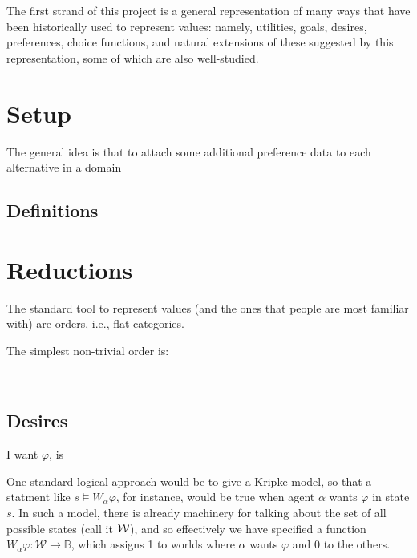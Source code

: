 \documentclass{article}
\begin{document}
	The first strand of this project is a general representation of many ways that have been historically used to represent values: namely, utilities, goals, desires, preferences, choice functions, and natural extensions of these suggested by this representation, some of which are also well-studied. 
	
	\section{Setup}
	
	
	The general idea is that to attach some additional preference data to each alternative in a domain
	
	\subsection{Definitions}
	

	
	\section{Reductions}
	
	The standard tool to represent values (and the ones that people are most familiar with) are orders, i.e., flat categories. 
	
	The simplest non-trivial order is:
	\begin{center}
		~
	\end{center}
	
	\subsection{Desires}
	
	I want $\varphi$, is 
	
	One standard logical approach would be to give a Kripke model, so that a statment like $s \vDash W_{\alpha} \varphi$, for instance, would be true when agent $\alpha$ wants $\varphi$ in state $s$. In such a model, there is already machinery for talking about the set of all possible states (call it $\cal W$), and so effectively we have specified a function $W_\alpha \varphi: \mathcal W \to \mathbb B$, which assigns 1 to worlds where $\alpha$ wants $\varphi$ and 0 to the others.
	
\end{document}
